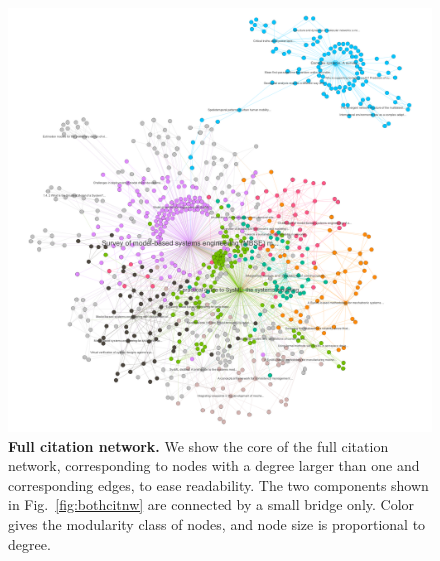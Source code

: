 \documentclass[runningheads,a4paper]{llncs2e/llncs}
\begin{document}
\begin{figure}[h!]
	\includegraphics[width=\linewidth]{figures/core.png}
	\caption{\textbf{Full citation network.} We show the core of the full citation network, corresponding to nodes with a degree larger than one and corresponding edges, to ease readability. The two components shown in Fig.~\ref{fig:bothcitnw} are connected by a small bridge only. Color gives the modularity class of nodes, and node size is proportional to degree.\label{fig:citnw}}
\end{figure}


\end{document}
